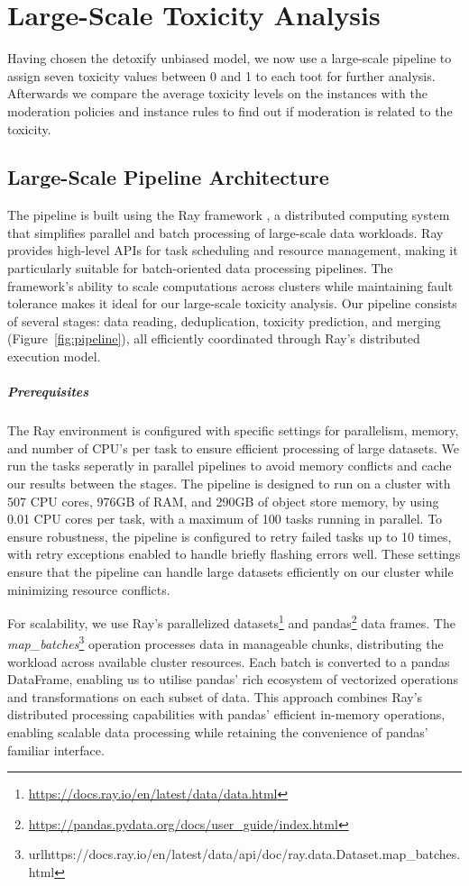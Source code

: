 \chapter{Large-Scale Toxicity Analysis} \label{large-scale-analysis}
Having chosen the detoxify unbiased model, we now use a large-scale pipeline to assign seven toxicity values between 0 and 1 to each toot for further analysis. Afterwards we compare the average toxicity levels on the instances with the moderation policies and instance rules to find out if moderation is related to the toxicity.

\section{Large-Scale Pipeline Architecture}
The pipeline is built using the Ray framework \cite{moritz:2018}, a distributed computing system that simplifies parallel and batch processing of large-scale data workloads. Ray provides high-level APIs for task scheduling and resource management, making it particularly suitable for batch-oriented data processing pipelines. The framework's ability to scale computations across clusters while maintaining fault tolerance makes it ideal for our large-scale toxicity analysis. Our pipeline consists of several stages: data reading, deduplication, toxicity prediction, and merging (Figure~\ref{fig:pipeline}), all efficiently coordinated through Ray's distributed execution model.

\paragraph{Prerequisites}
The Ray environment is configured with specific settings for parallelism, memory, and number of CPU's per task to ensure efficient processing of large datasets. We run the tasks seperatly in parallel pipelines to avoid memory conflicts and cache our results between the stages. The pipeline is designed to run on a cluster with 507 CPU cores, 976GB of RAM, and 290GB of object store memory, by using 0.01 CPU cores per task, with a maximum of 100 tasks running in parallel. To ensure robustness, the pipeline is configured to retry failed tasks up to 10 times, with retry exceptions enabled to handle briefly flashing errors well. These settings ensure that the pipeline can handle large datasets efficiently on our cluster while minimizing resource conflicts.

For scalability, we use Ray's parallelized datasets\footnote{\url{https://docs.ray.io/en/latest/data/data.html}} and pandas\footnote{\url{https://pandas.pydata.org/docs/user\_guide/index.html}} data frames. The \textit{map\_batches}\footnote{url{https://docs.ray.io/en/latest/data/api/doc/ray.data.Dataset.map\_batches.html}} operation processes data in manageable chunks, distributing the workload across available cluster resources. Each batch is converted to a pandas DataFrame, enabling us to utilise pandas' rich ecosystem of vectorized operations and transformations on each subset of data. This approach combines Ray's distributed processing capabilities with pandas' efficient in-memory operations, enabling scalable data processing while retaining the convenience of pandas' familiar interface.

